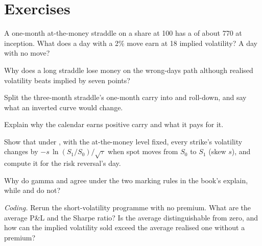 \section{Exercises}

\begin{exercise}[$\star$]\label{exo:dv:trading-volatility:1}
A one-month at-the-money straddle on a share at 100 has a  of about 770 at inception. What does a day with a 2\% move earn at 18
implied volatility? A day with no move?
\end{exercise}

\begin{exercise}[$\star$]\label{exo:dv:trading-volatility:2}
Why does a long straddle lose money on the wrong-days path although realised volatility beats implied by seven points?
\end{exercise}

\begin{exercise}[$\star$]\label{exo:dv:trading-volatility:3}
Split the three-month straddle's one-month carry into  and roll-down, and say what an inverted curve would change.
\end{exercise}

\begin{exercise}[$\star\star$]\label{exo:dv:trading-volatility:4}
Explain why the calendar earns positive carry and what it pays for it.
\end{exercise}

\begin{exercise}[$\star\star$]\label{exo:dv:trading-volatility:5}
Show that under , with the at-the-money level fixed, every strike's volatility changes by $-s\,\ln(S_1/S_0)/\sqrt\tau$ when spot
moves from $S_0$ to $S_1$ (skew $s$), and compute it for the risk reversal's day.
\end{exercise}

\begin{exercise}[$\star\star$]\label{exo:dv:trading-volatility:6}
Why do gamma and  agree under the two marking rules in the book's explain, while  and  do not?
\end{exercise}

\begin{exercise}[$\star\star\star$]\label{exo:dv:trading-volatility:7}
\emph{Coding.} Rerun the short-volatility programme with no premium. What are the average P\&L and the Sharpe ratio? Is the average
distinguishable from zero, and how can the implied volatility sold exceed the average realised one without a premium?
\end{exercise}


